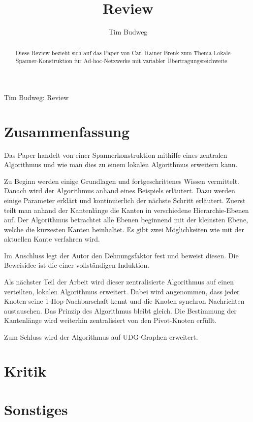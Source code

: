 \documentclass[a4paper,twoside]{IEEEtran}
\newcommand{\seminarteilnehmer}{Tim Budweg}
\newcommand{\seminartitel}{Review}
\begin{document}
\title{\seminartitel}
\author{\seminarteilnehmer}

%
{\seminarteilnehmer: \seminartitel}


\maketitle

\begin{abstract}
Diese Review bezieht sich auf das Paper von Carl Rainer Brenk zum Thema \glqq Lokale Spanner-Konstruktion für Ad-hoc-Netzwerke
mit variabler Übertragungsreichweite\grqq
\end{abstract}

\section{Zusammenfassung}
Das Paper handelt von einer Spannerkonstruktion mithilfe eines zentralen Algorithmus und wie man dies zu einem lokalen Algorithmus erweitern kann.

Zu Beginn werden einige Grundlagen und fortgeschrittenes Wissen vermittelt.
Danach wird der Algorithmus anhand eines Beispiels erläutert.
Dazu werden einige Parameter erklärt und kontinuierlich der nächste Schritt erläutert.
Zuerst teilt man anhand der Kantenlänge die Kanten in verschiedene Hierarchie-Ebenen auf.
Der Algorithmus betrachtet alle Ebenen beginnend mit der kleinsten Ebene, welche die kürzesten Kanten beinhaltet. 
Es gibt zwei Möglichkeiten wie mit der aktuellen Kante verfahren wird.

Im Anschluss legt der Autor den Dehnungsfaktor fest und beweist diesen.
Die Beweisidee ist die einer vollständigen Induktion.

Als nächster Teil der Arbeit wird dieser zentralisierte Algorithmus auf einen verteilten, lokalen Algorithmus erweitert.
Dabei wird angenommen, dass jeder Knoten seine 1-Hop-Nachbarschaft kennt und die Knoten synchron Nachrichten austauschen.
Das Prinzip des Algorithmus bleibt gleich. 
Die Bestimmung der Kantenlänge wird weiterhin zentralisiert von den Pivot-Knoten erfüllt.

Zum Schluss wird der Algorithmus auf UDG-Graphen erweitert.




\section{Kritik}

\section{Sonstiges}
\end{document}
